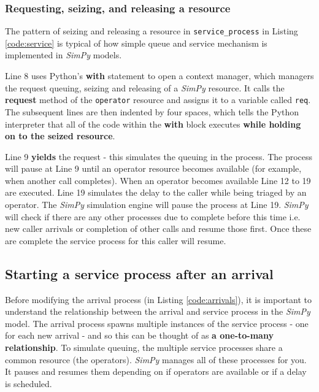 \documentclass{swpaperproc}
\theoremstyle{sw}
\begin{document}
\subsubsection{Requesting, seizing, and releasing a resource}

The pattern of seizing and releasing a resource in \verb|service_process| in Listing \ref{code:service} is typical of how simple queue and service mechanism is implemented in \textit{SimPy} models.

Line 8 uses Python's \textbf{with} statement to open a context manager, which managers the request queuing, seizing and releasing of a \textit{SimPy} resource. It calls the \textbf{request} method of the \verb|operator| resource and assigns it to a variable called \verb|req|. The subsequent lines are then indented by four spaces, which tells the Python interpreter that all of the code within the \textbf{with} block executes \textbf{while holding on to the seized resource}.

Line 9 \textbf{yields} the request - this simulates the queuing in the process.  The process will pause at Line 9 until an operator resource becomes available (for example, when another call completes). When an operator becomes available Line 12 to 19 are executed. Line 19 simulates the delay to the caller while being triaged by an operator. The \textit{SimPy} simulation engine will pause the process at Line 19. \textit{SimPy} will check if there are any other processes due to complete before this time i.e. new caller arrivals or completion of other calls and resume those first.  Once these are complete the service process for this caller will resume.

\subsection{Starting a service process after an arrival}

Before modifying the arrival process (in Listing \ref{code:arrivals}), it is important to understand the relationship between the arrival and service process in the \textit{SimPy} model. The arrival process spawns multiple instances of the service process - one for each new arrival - and so this can be thought of as \textbf{a one-to-many relationship}. To simulate queuing, the multiple service processes share a common resource (the operators). \textit{SimPy} manages all of these processes for you. It pauses and resumes them depending on if operators are available or if a delay is scheduled.
\end{document}
